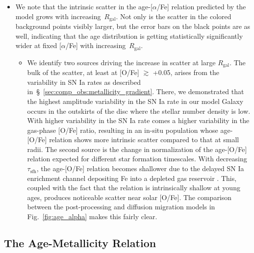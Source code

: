 \documentclass[fleqn, usenatbib]{mnras}
\begin{document}
\begin{itemize}
	\item We note that the intrinsic scatter in the age-[$\alpha$/Fe] relation 
	predicted by the model grows with increasing~$R_\text{gal}$. Not only is 
	the scatter in the colored background points visibly larger, but the error 
	bars on the black points are as well, indicating that the age distribution 
	is getting statistically significantly wider at fixed [$\alpha$/Fe] with 
	increasing~$R_\text{gal}$. 
	\begin{itemize} 
		\item We identify two sources driving the increase in scatter at large 
		$R_\text{gal}$. The bulk of the scatter, at least at [O/Fe] 
		$\gtrsim$ +0.05, arises from the variability in SN Ia rates as 
		described in~\S~\ref{sec:comp_obs:metallicity_gradient}. There, we 
		demonstrated that the highest amplitude variability in the SN Ia rate 
		in our model Galaxy occurs in the outskirts of the disc where the 
		stellar number density is low. With higher variability in the SN Ia 
		rate comes a higher variability in the gas-phase [O/Fe] ratio, 
		resulting in an in-situ population whose age-[O/Fe] relation shows more 
		intrinsic scatter compared to that at small radii. The second source is 
		the change in normalization of the age-[O/Fe] relation expected for 
		different star formation timescales. With decreasing~$\tau_\text{sfh}$, 
		the age-[O/Fe] relation becomes shallower due to the delayed SN Ia 
		enrichment channel depositing Fe into a depleted gas reservoir 
		\citep{Weinberg2017}. This, coupled with the fact that the relation is 
		intrinsically shallow at young ages, produces noticeable scatter near 
		solar [O/Fe]. The comparison between the post-processing and diffusion 
		migration models in Fig.~\ref{fig:age_alpha} makes this fairly clear. 
	\end{itemize} 
\end{itemize} 

\subsection{The Age-Metallicity Relation} 
\label{sec:comp_obs:amr} 
\end{document}
